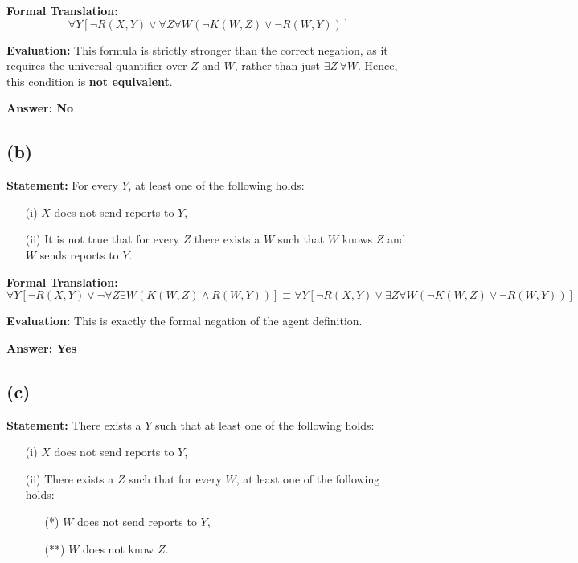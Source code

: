 \documentclass[12pt]{article}
\begin{document}
\textbf{Formal Translation:}
\begin{equation*}
    \forall Y \left[ \neg R(X,Y) \lor \forall Z \forall W ( \neg K(W,Z) \lor \neg R(W,Y) ) \right]
\end{equation*}

\textbf{Evaluation:} This formula is strictly stronger than the correct negation, as it requires the universal quantifier over $Z$ and $W$, rather than just $\exists Z \, \forall W$. Hence, this condition is \textbf{not equivalent}.

\textbf{Answer: No}

\subsection*{(b)}
\textbf{Statement:} For every $Y$, at least one of the following holds:
\begin{itemize}
    \item[(i)] $X$ does not send reports to $Y$,
    \item[(ii)] It is not true that for every $Z$ there exists a $W$ such that $W$ knows $Z$ and $W$ sends reports to $Y$.
\end{itemize}

\textbf{Formal Translation:}
\begin{equation*}
    \forall Y \left[ \neg R(X,Y) \lor \neg \forall Z \exists W (K(W,Z) \land R(W,Y)) \right]
    \equiv \forall Y \left[ \neg R(X,Y) \lor \exists Z \forall W ( \neg K(W,Z) \lor \neg R(W,Y) ) \right]
\end{equation*}

\textbf{Evaluation:} This is exactly the formal negation of the agent definition.

\textbf{Answer: Yes}

\subsection*{(c)}
\textbf{Statement:} There exists a $Y$ such that at least one of the following holds:
\begin{itemize}
    \item[(i)] $X$ does not send reports to $Y$,
    \item[(ii)] There exists a $Z$ such that for every $W$, at least one of the following holds:
    \begin{itemize}
        \item[(*)] $W$ does not send reports to $Y$,
        \item[(**)] $W$ does not know $Z$.
    \end{itemize}
\end{itemize}
\end{document}
